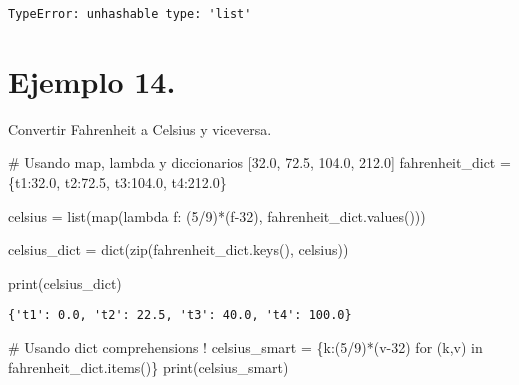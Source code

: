 \documentclass[
  letterpaper,
  DIV=11,
  numbers=noendperiod]{scrreprt}
\newenvironment{Shaded}{\begin{snugshade}}{\end{snugshade}}
\newcommand{\BuiltInTok}[1]{\textcolor[rgb]{0.00,0.23,0.31}{#1}}
\newcommand{\CommentTok}[1]{\textcolor[rgb]{0.37,0.37,0.37}{#1}}
\newcommand{\ControlFlowTok}[1]{\textcolor[rgb]{0.00,0.23,0.31}{#1}}
\newcommand{\DecValTok}[1]{\textcolor[rgb]{0.68,0.00,0.00}{#1}}
\newcommand{\FloatTok}[1]{\textcolor[rgb]{0.68,0.00,0.00}{#1}}
\newcommand{\KeywordTok}[1]{\textcolor[rgb]{0.00,0.23,0.31}{#1}}
\newcommand{\NormalTok}[1]{\textcolor[rgb]{0.00,0.23,0.31}{#1}}
\newcommand{\OperatorTok}[1]{\textcolor[rgb]{0.37,0.37,0.37}{#1}}
\newcommand{\StringTok}[1]{\textcolor[rgb]{0.13,0.47,0.30}{#1}}
\begin{document}
\begin{verbatim}
TypeError: unhashable type: 'list'
\end{verbatim}

\section{\texorpdfstring{\textbf{Ejemplo
14.}}{Ejemplo 14.}}\label{ejemplo-14.-1}

Convertir Fahrenheit a Celsius y viceversa.

\begin{Shaded}
\begin{Highlighting}[]
\CommentTok{\# Usando map, lambda y diccionarios}
\NormalTok{[}\FloatTok{32.0}\NormalTok{, }\FloatTok{72.5}\NormalTok{, }\FloatTok{104.0}\NormalTok{, }\FloatTok{212.0}\NormalTok{]}
\NormalTok{fahrenheit\_dict }\OperatorTok{=}\NormalTok{ \{}\StringTok{\textquotesingle{}t1\textquotesingle{}}\NormalTok{:}\FloatTok{32.0}\NormalTok{, }\StringTok{\textquotesingle{}t2\textquotesingle{}}\NormalTok{:}\FloatTok{72.5}\NormalTok{, }\StringTok{\textquotesingle{}t3\textquotesingle{}}\NormalTok{:}\FloatTok{104.0}\NormalTok{, }\StringTok{\textquotesingle{}t4\textquotesingle{}}\NormalTok{:}\FloatTok{212.0}\NormalTok{\}}

\NormalTok{celsius }\OperatorTok{=} \BuiltInTok{list}\NormalTok{(}\BuiltInTok{map}\NormalTok{(}\KeywordTok{lambda}\NormalTok{ f: (}\DecValTok{5}\OperatorTok{/}\DecValTok{9}\NormalTok{)}\OperatorTok{*}\NormalTok{(f}\OperatorTok{{-}}\DecValTok{32}\NormalTok{), fahrenheit\_dict.values()))}

\NormalTok{celsius\_dict }\OperatorTok{=} \BuiltInTok{dict}\NormalTok{(}\BuiltInTok{zip}\NormalTok{(fahrenheit\_dict.keys(), celsius))}

\BuiltInTok{print}\NormalTok{(celsius\_dict)}
\end{Highlighting}
\end{Shaded}

\begin{verbatim}
{'t1': 0.0, 't2': 22.5, 't3': 40.0, 't4': 100.0}
\end{verbatim}

\begin{Shaded}
\begin{Highlighting}[]
\CommentTok{\# Usando dict comprehensions !}
\NormalTok{celsius\_smart }\OperatorTok{=}\NormalTok{ \{k:(}\DecValTok{5}\OperatorTok{/}\DecValTok{9}\NormalTok{)}\OperatorTok{*}\NormalTok{(v}\OperatorTok{{-}}\DecValTok{32}\NormalTok{) }\ControlFlowTok{for}\NormalTok{ (k,v) }\KeywordTok{in}\NormalTok{ fahrenheit\_dict.items()\}}
\BuiltInTok{print}\NormalTok{(celsius\_smart)}
\end{Highlighting}
\end{Shaded}
\end{document}
